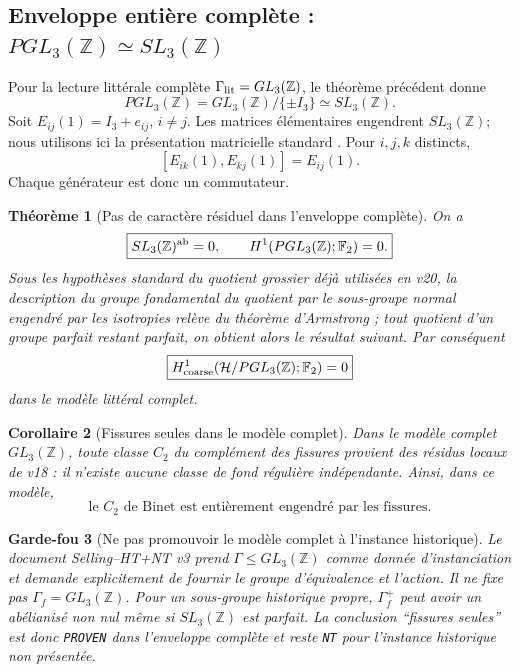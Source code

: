 \documentclass[11pt,a4paper]{article}
\newtheorem{theorem}{Théorème}[section]
\newtheorem{corollary}[theorem]{Corollaire}
\newtheorem{guardrail}[theorem]{Garde-fou}
\newcommand{\Z}{\mathbb Z}
\newcommand{\certProven}{\texttt{PROVEN}}
\newcommand{\certNT}{\texttt{NT}}
\begin{document}
\subsection{Enveloppe entière complète : \texorpdfstring{$PGL_3(\Z)\simeq SL_3(\Z)$}{PGL3Z=SL3Z}}

Pour la lecture littérale complète $\Gamma_{\rm lit}=GL_3(\Z)$, le théorème précédent donne
\begin{equation}\label{eq:v23-PGL-SL}
 \boxed{PGL_3(\Z)=GL_3(\Z)/\{\pm I_3\}\simeq SL_3(\Z).}
\end{equation}
Soit $E_{ij}(1)=I_3+e_{ij}$, $i\neq j$. Les matrices élémentaires engendrent $SL_3(\Z)$; nous utilisons ici la présentation matricielle standard \cite{Newman1972}. Pour $i,j,k$ distincts,
\begin{equation}\label{eq:v23-Steinberg-commutator}
 \boxed{[E_{ik}(1),E_{kj}(1)]=E_{ij}(1).}
\end{equation}
Chaque générateur est donc un commutateur.

\begin{theorem}[Pas de caractère résiduel dans l'enveloppe complète]\label{thm:v23-full-H1-zero}
On a
\[
 \boxed{SL_3(\Z)^{\rm ab}=0,\qquad H^1(PGL_3(\Z);\mathbb F_2)=0.}
\]
Sous les hypothèses standard du quotient grossier déjà utilisées en v20, la description du groupe fondamental du quotient par le sous-groupe normal engendré par les isotropies relève du théorème d'Armstrong \cite{Armstrong1968}; tout quotient d'un groupe parfait restant parfait, on obtient alors le résultat suivant. Par conséquent
\[
 \boxed{H^1_{\rm coarse}(\mathcal H/PGL_3(\Z);\mathbb F_2)=0}
\]
dans le modèle littéral complet.
\end{theorem}

\begin{corollary}[Fissures seules dans le modèle complet]\label{cor:v23-fissures-only-full}
Dans le modèle complet $GL_3(\Z)$, toute classe $C_2$ du complément des fissures provient des résidus locaux de v18 : il n'existe aucune classe de fond régulière indépendante. Ainsi, dans ce modèle,
\[
 \boxed{\text{le }C_2\text{ de Binet est entièrement engendré par les fissures}.}
\]
\end{corollary}

\begin{guardrail}[Ne pas promouvoir le modèle complet à l'instance historique]
Le document Selling--HT+NT v3 prend $\Gamma\le GL_3(\Z)$ comme donnée d'instanciation et demande explicitement de fournir le groupe d'équivalence et l'action. Il ne fixe pas $\Gamma_f=GL_3(\Z)$. Pour un sous-groupe historique propre, $\Gamma_f^+$ peut avoir un abélianisé non nul même si $SL_3(\Z)$ est parfait. La conclusion ``fissures seules'' est donc \certProven{} dans l'enveloppe complète et reste \certNT{} pour l'instance historique non présentée.
\end{guardrail}
\end{document}
